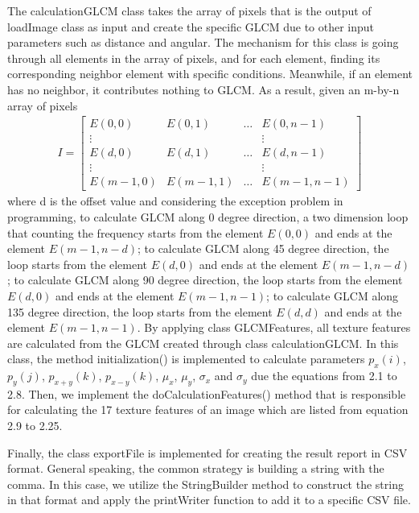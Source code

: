 The calculationGLCM class takes the array of pixels that is the output of loadImage class as input and create the specific GLCM due to other input parameters such as distance and angular. The mechanism for this class is going through all elements in the array of pixels, and for each element, finding its corresponding neighbor element with specific conditions. Meanwhile, if an element has no neighbor, it contributes nothing to GLCM. As a result, given an m-by-n array of pixels
\begin{align*}
I = 
\begin{bmatrix}
E(0,0) & E(0,1) & \ldots & E(0,n-1) \\
\vdots &         &         & \vdots \\
E(d,0) & E(d,1) & \ldots & E(d,n-1) \\
\vdots &         &         & \vdots \\
E(m-1,0) & E(m-1,1) & \ldots & E(m-1,n-1) 
\end{bmatrix}
\end{align*} where d is the offset value and considering the exception problem in programming,
to calculate GLCM along 0 degree direction, a two dimension loop that counting the frequency starts from the element $E(0,0)$ and ends at the element $E(m-1, n-d)$; to calculate GLCM along 45 degree direction, the loop starts from the element $E(d,0)$ and ends at the element $E(m-1, n-d)$; to calculate GLCM along 90 degree direction, the loop starts from the element $E(d,0)$ and ends at the element $E(m-1, n-1)$; to calculate GLCM along 135 degree direction, the loop starts from the element $E(d,d)$ and ends at the element $E(m-1, n-1)$. 
By applying class GLCMFeatures, all texture features are calculated from the GLCM created through class calculationGLCM. In this class, the method initialization() is implemented to calculate parameters $p_x(i)$, $p_y(j)$, $p_{x+y}(k)$, $p_{x-y}(k)$, $\mu_x$, $\mu_y$, $\sigma_x$ and $\sigma_y$ due the equations from 2.1 to 2.8. Then, we implement the doCalculationFeatures() method that is responsible for calculating the 17 texture features of an image which are listed from equation 2.9 to 2.25.\par
Finally, the class exportFile is implemented for creating the result report in CSV format. General speaking, the common strategy is building a string with the comma. In this case, we utilize the StringBuilder method to construct the string in that format and apply the printWriter function to add it to a specific CSV file. 

